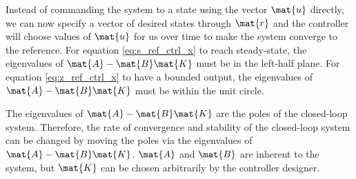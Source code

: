 Instead of commanding the \gls{system} to a \gls{state} using the vector
$\mat{u}$ directly, we can now specify a vector of desired \glspl{state} through
$\mat{r}$ and the \gls{controller} will choose values of $\mat{u}$ for us over
time to make the \gls{system} converge to the \gls{reference}. For equation
\eqref{eq:s_ref_ctrl_x} to reach steady-state, the eigenvalues of
$\mat{A} - \mat{B}\mat{K}$ must be in the left-half plane. For equation
\eqref{eq:z_ref_ctrl_x} to have a bounded output, the eigenvalues of
$\mat{A} - \mat{B}\mat{K}$ must be within the unit circle.

The eigenvalues of $\mat{A} - \mat{B}\mat{K}$ are the poles of the closed-loop
\gls{system}. Therefore, the rate of convergence and stability of the
closed-loop \gls{system} can be changed by moving the poles via the eigenvalues
of $\mat{A} - \mat{B}\mat{K}$. $\mat{A}$ and $\mat{B}$ are inherent to the
\gls{system}, but $\mat{K}$ can be chosen arbitrarily by the controller
designer.
